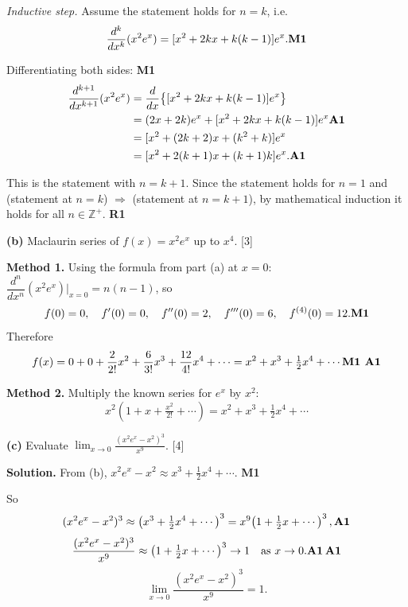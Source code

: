 \documentclass[12pt, twoside]{article}
\begin{document}
\begin{enumerate}[itemsep=0.3cm]
\textit{Inductive step.} Assume the statement holds for $n = k$, i.e.\
\[
\frac{d^k}{dx^k}(x^2 e^x) = [x^2 + 2kx + k(k-1)] e^x. \hfill \textbf{M1}
\]

Differentiating both sides: \hfill \textbf{M1}
\begin{align*}
\frac{d^{k+1}}{dx^{k+1}}(x^2 e^x)
&= \frac{d}{dx}\!\left\{[x^2 + 2kx + k(k-1)] e^x\right\} \\
&= (2x + 2k) e^x + [x^2 + 2kx + k(k-1)] e^x \hfill \textbf{A1} \\
&= [x^2 + (2k + 2)x + (k^2 + k)] e^x \\
&= [x^2 + 2(k+1)x + (k+1)k] e^x. \hfill \textbf{A1}
\end{align*}

This is the statement with $n = k + 1$. Since the statement holds for
$n = 1$ and (statement at $n = k$) $\Rightarrow$ (statement at $n = k+1$),
by mathematical induction it holds for all $n \in \mathbb{Z}^{+}$.
\hfill \textbf{R1}

\medskip

\textbf{(b)} Maclaurin series of $f(x) = x^2 e^x$ up to $x^4$. \hfill [3]

\textbf{Method 1.} Using the formula from part (a) at $x = 0$:
$\dfrac{d^n}{dx^n}(x^2 e^x)\Big|_{x=0} = n(n - 1)$, so
\[
f(0) = 0,\quad f'(0) = 0,\quad f''(0) = 2,\quad
f'''(0) = 6,\quad f^{(4)}(0) = 12. \hfill \textbf{M1}
\]
Therefore
\[
f(x) = 0 + 0 + \frac{2}{2!}x^2 + \frac{6}{3!}x^3 + \frac{12}{4!}x^4 + \cdots
= x^2 + x^3 + \tfrac{1}{2}x^4 + \cdots \hfill \textbf{M1 A1}
\]

\textbf{Method 2.} Multiply the known series for $e^x$ by $x^2$:
\[
x^2\!\left(1 + x + \tfrac{x^2}{2!} + \cdots\right)
= x^2 + x^3 + \tfrac{1}{2}x^4 + \cdots
\]

\medskip

\textbf{(c)} Evaluate
$\displaystyle\lim_{x \to 0}\frac{(x^2 e^x - x^2)^3}{x^9}$. \hfill [4]

\textbf{Solution.} From (b), $x^2 e^x - x^2 \approx x^3 + \tfrac{1}{2}x^4 + \cdots$.
\hfill \textbf{M1}

So
\[
(x^2 e^x - x^2)^3 \approx \left(x^3 + \tfrac{1}{2}x^4 + \cdots\right)^3
= x^9\!\left(1 + \tfrac{1}{2}x + \cdots\right)^3, \hfill \textbf{A1}
\]
\[
\frac{(x^2 e^x - x^2)^3}{x^9} \approx \left(1 + \tfrac{1}{2}x + \cdots\right)^3
\to 1 \quad\text{as } x \to 0. \hfill \textbf{A1\,A1}
\]
\[
\boxed{\lim_{x \to 0}\frac{(x^2 e^x - x^2)^3}{x^9} = 1.}
\]

\end{enumerate}
\end{document}
